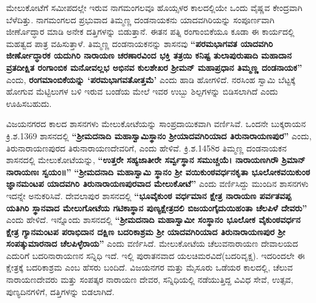 \vskip 3pt

ಮೇಲುಕೋಟೆಗೆ ಸಮೀಪದಲ್ಲೇ ಇರುವ ನಾಗಮಂಗಲವೂ ಹೊಯ್ಸಳರ ಕಾಲದಲ್ಲಿಯೇ ಒಂದು ವೈಷ್ಣವ ಕೇಂದ್ರವಾಗಿ ಬೆಳೆದಿತ್ತು. ನಾಗಮಂಗಲದ ಪ್ರಭುವಾದ ತಿಮ್ಮಣ್ಣ ದಂಡನಾಯಕನು ಯಾದವಗಿರಿಯನ್ನು ಸಂಪೂರ್ಣವಾಗಿ ಜೀರ್ಣೊದ್ಧಾರ ಮಾಡಿ ಅನೇಕ ದತ್ತಿಗಳನ್ನು ಬಿಡುತ್ತಾನೆ. ಈತನ ಪತ್ನಿ ರಂಗಾಂಬಿಕೆಯೂ ಕೂಡಾ ಈ ಕಾರ್ಯದಲ್ಲಿ ಮಹತ್ವದ ಪಾತ್ರ ವಹಿಸುತ್ತಾಳೆ. ತಿಮ್ಮಣ್ಣ ದಂಡನಾಯಕನನ್ನು ಶಾಸನವು\textbf{ “ಪರಮಭಾಗವತ ಯಾದವಗಿರಿ ಜೀರ್ಣೋದ್ಧಾರಕ ಯದುಗಿರಿ ನಾರಾಯಣ ಚರಣಾರವಿಂದ ಭಕ್ತಿ ತತ್ರಯಿ ಕನಿಷ್ಟ ತುಲಾಪುರುಷಾದಿ ಮಹಾದಾನ ವ್ರತದೀಕ್ಷಿತ ರಂಗಾಂಬಿಕ ಮನೋವಲ್ಲಭ ಅಭಿನವ ಕುಲಶೇಖರ ಶ‍್ರೀಮನ್​ ಮಹಾಪ್ರಧಾನ ತಿಮ್ಮಣ್ಣ ದಂಡನಾಯಕ”} ಎಂದು, \textbf{ರಂಗಮಾಂಬಿಕೆಯನ್ನು ‘ಪರಮಭಾಗವತೋ\-ತ್ತಮೆ’} ಎಂದು ಹಾಡಿ ಹೋಗಳಿದೆ. ನರಸಿಂಹ ಸ್ವಾಮಿ ಬೆಟ್ಟಕ್ಕೆ ಹೋಗುವ ಮೆಟ್ಟಿಲುಗಳ ಬಳಿ ಇರುವ ಬಂಡೆಯ ಮೇಲೆ ಇವರ ಉಬ್ಬು ಶಿಲ್ಪಗಳನ್ನು ಬಿಡಿಸಲಾಗಿದೆ ಎಂದು ಊಹಿಸಬಹುದು.

ವಿಜಯನಗರದ ಕಾಲದ ಶಾಸನಗಳು ಮೇಲುಕೋಟೆಯನ್ನು ಸಾಂಪ್ರದಾಯಿಕವಾಗಿ ವರ್ಣಿಸಿವೆ. ಒಂದನೇ ಬುಕ್ಕರಾಯನ ಕ್ರಿ.ಶ.1369 ಶಾಸನದಲ್ಲಿ \textbf{“ಶ‍್ರೀಮದನಾದಿ ಮಹಾಸ್ವಾಮಿಸ್ಥಾನಂ ಶ‍್ರೀಯಾದವಗಿರಿಯಾದ ತಿರುನಾರಾಯಣಪುರ”} ಎಂದು, ತಿರುನಾರಾಯಣಪುರದ ತಿರುನಾರಾಯಣದೇವರಿಗೆ, ಎಂದು ಹೇಳಿವೆ. ಕ್ರಿ.ಶ.1458ರ ತಿಮ್ಮಣ್ಣ ದಂಡನಾಯಕನ ಶಾಸನದಲ್ಲಿ ಮೇಲುಕೋಟೆಯನ್ನು, \textbf{ “ಉತ್ತರೇ ಸಹ್ಯಜಾತೀರೇ ಸರ್ವ್ವಸ್ಥಾನ ಸಮುಚ್ಚಯೆ। ನಾರಾಯಣಗಿರೌ ಶ್ರಿಮಾನ್​ ನಾರಾಯಣಃ ಸ್ವಯಂ॥”} \textbf{“ಶ‍್ರೀಮದನಾದಿ ಮಹಾಸ್ವಾಮಿ ಸ್ಥಾನಂ ಶ‍್ರೀ ವಯಿಕುಂಠವರ್ಧನಕೃತಾ ಭೂಲೋಕವಯಿಕುಂಠ ಜ್ಞಾನಮಂಟಪ ಯಾದವಗಿರಿ ತಿರುನಾರಾಯಣಪುರವಾದ ಮೇಲುಕೋಟೆ”} ಎಂದು ವರ್ಣಿಸಿದ್ದು ಮುಂದಿನ ಶಾಸನಗಳು ಇದನ್ನೇ ಅನುಕರಿಸಿವೆ. ದೇವಲಾಪುರ ಶಾಸನದಲ್ಲಿ \textbf{“ಭೂವೈಕುಂಠ ವರ್ಧಮಾನ ಕ್ಷೇತ್ರ ನಾರಾಯಣ ಪರ್ವತವಪ್ಪ ಯತಿಗಿರಿ ಸ್ಥಾನವಾದ ಮೇಲುಗೋಟೆಯ ಗಟಿಕಾಸ್ಥಾನ ಪುಣ್ಯಕ್ಷೇತ್ರದಲಿ ಬಿಜಯಂಗೈದುಯಿಹಂತಾ ಚೆಲಪಿಳೆ ದೇವರು” }ಎಂದು ಹೇಳಿದೆ. ಇನ್ನೊಂದು ಶಾಸನದಲ್ಲಿ\textbf{ “ಶ‍್ರೀಮದನಾದಿ ಮಹಾಸ್ವಾಮೀ ಸಂಸ್ಥಾನಂ ಭೂಲೋಕ ವೈಕುಂಠವರ್ಧನ ಕ್ಷೇತ್ರ ಗ್ಯಾನಮಂಟಪ ಪರಾಭಿದಾನ ದಕ್ಷಿಣ ಬದರಿಕಾಶ್ರಮ ಶ‍್ರೀ ಯಾದವಗಿರಿಯಾದ ತಿರುನಾರಾಯಣಪುರ ಶ‍್ರೀ ಸಂಪತ್ಕುಮಾರನಾದ ಚೆಲಪಿಳ್ಳೆರಾಯ” }ಎಂದು ವರ್ಣಿಸಿದೆ. ಮೇಲುಕೋಟೆಯ ಚೆಲುವನಾರಾಯಣ ದೇವಾಲಯದ ಎದುರಿಗೆ ಬದರಿನಾರಾಯಣನ ಸನ್ನಿಧಿ ಇದೆ. ಇಲ್ಲಿ ಪುರಾತನವಾದ ಯಲಚಿಮರವಿದೆ(ಬದರಿವೃಕ್ಷ). ಇದರಿಂದಲೇ ಈ ಕ್ಷೇತ್ರಕ್ಕೆ ಬದರಿಕಾಶ್ರಮ ಎಂಬ ಹೆಸರು ಬಂದಿದೆ. ವಿಜಯನಗರ ಮತ್ತು ಮೈಸೂರು ಒಡೆಯರ ಕಾಲದಲ್ಲಿ, ಚೆಲುವ ನಾರಾಯಣದೇವರು ಮತ್ತು ಸಂಪತ್ಕರ ನಾರಾಯಣ ದೇವರ, ಸನ್ನಿಧಿಯಲ್ಲಿ ನಡೆಯುತ್ತಿದ್ದ ವಿವಿಧ ಸೇವೆ, ಉತ್ಸವ, ಪುಣ್ಯದಿನಗಳಿಗೆ, ದತ್ತಿಗಳನ್ನು ಬಿಡಲಾಗಿದೆ.

